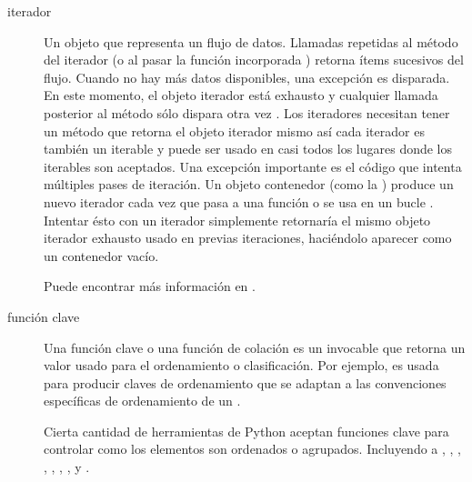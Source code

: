 \documentclass[a4,10pt,spanish]{sphinxmanual}
\begin{document}
\begin{description}
\item[{iterador\label{\detokenize{glossary:term-iterator}}}] \leavevmode
\sphinxAtStartPar
Un objeto que representa un flujo de datos.  Llamadas repetidas al método   del iterador (o al pasar la función incorporada ) retorna ítems sucesivos del flujo.  Cuando no hay más datos disponibles, una excepción  es disparada.  En este momento, el objeto iterador está exhausto y cualquier llamada posterior al método  sólo dispara otra vez .  Los iteradores necesitan tener un método  que retorna el objeto iterador mismo así cada iterador es también un iterable y puede ser usado en casi todos los lugares donde los iterables son aceptados.  Una excepción importante es el código que intenta múltiples pases de iteración.  Un objeto contenedor (como la ) produce un nuevo iterador cada vez que pasa a una función  o se usa en un bucle  .  Intentar ésto con un iterador simplemente retornaría el mismo objeto iterador exhausto usado en previas iteraciones, haciéndolo aparecer como un contenedor vacío.

\sphinxAtStartPar
Puede encontrar más información en .

\item[{función clave\label{\detokenize{glossary:term-key-function}}}] \leavevmode
\sphinxAtStartPar
Una función clave o una función de colación es un invocable que retorna un valor usado para el ordenamiento o clasificación.  Por ejemplo,  es usada para producir claves de ordenamiento que se adaptan a las convenciones específicas de ordenamiento de un .

\sphinxAtStartPar
Cierta cantidad de herramientas de Python aceptan funciones clave para controlar como los elementos son ordenados o agrupados. Incluyendo a  , , , , , , , y .


\end{description}
\end{document}
